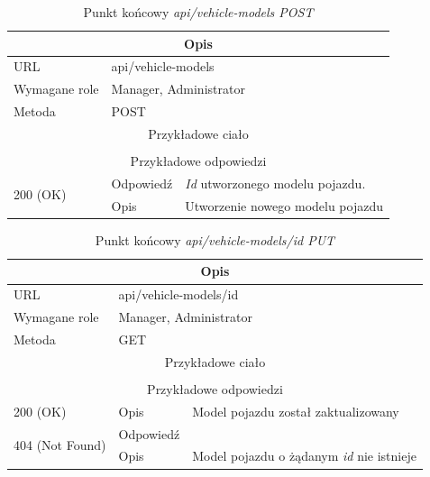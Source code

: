 \documentclass[eng,printmode,openany]{mgr}
\begin{document}
	\begin{table}[H]
		\caption{Punkt końcowy \textit{api/vehicle-models POST}}
		\begin{tabularx}{\textwidth}{|l|l|X|}
			\hline
			\multicolumn{3}{|c|}{Opis}                         						\\ \hline
			URL                       & \multicolumn{2}{l|}{api/vehicle-models} 	\\ \hline
			Wymagane role             & \multicolumn{2}{l|}{Manager, Administrator} \\ \hline
			Metoda                    & \multicolumn{2}{l|}{POST} 					\\ \hline
			\multicolumn{3}{|c|}{Przykładowe ciało}         						\\ \hline
			\multicolumn{3}{|c|}{} 				\\ \hline
			\multicolumn{3}{|c|}{ Przykładowe odpowiedzi}                   									\\ \hline
			\multirow{2}{*}{200 (OK)} 			& Odpowiedź     &  \textit{Id} utworzonego modelu pojazdu.    	\\ \cline{2-3} 
			& Opis         	& Utworzenie nowego modelu pojazdu   			\\ \hline
		\end{tabularx}
	\end{table}
	
	\begin{table}[H]
		\caption{Punkt końcowy \textit{api/vehicle-models/id PUT}}
		\begin{tabularx}{\textwidth}{|l|l|X|}
			\hline
			\multicolumn{3}{|c|}{Opis}                         						\\ \hline
			URL                       & \multicolumn{2}{l|}{api/vehicle-models/id} 	\\ \hline
			Wymagane role             & \multicolumn{2}{l|}{Manager, Administrator} \\ \hline
			Metoda                    & \multicolumn{2}{l|}{GET} 					\\ \hline
			\multicolumn{3}{|c|}{Przykładowe ciało}         						\\ \hline
			\multicolumn{3}{|c|}{} 												\\ \hline
			\multicolumn{3}{|c|}{Przykładowe odpowiedzi}                   																		\\ \hline
			200 (OK)			& Opis         	& Model pojazdu został zaktualizowany 															\\ \hline
			\multirow{2}{*}{404 (Not Found)} 	& Odpowiedź     &    \\ \cline{2-3} 
			& Opis          & Model pojazdu o żądanym \textit{id} nie istnieje  											\\ \hline
		\end{tabularx}
	\end{table}
	
\end{document}
